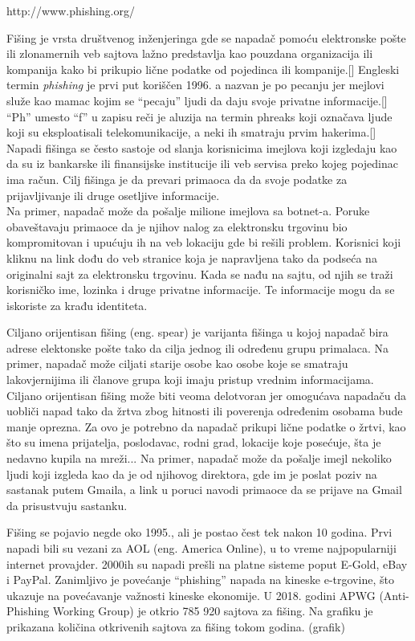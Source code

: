 \documentclass[a4paper]{article}
\begin{document}
http://www.phishing.org/

Fišing je vrsta društvenog inženjeringa gde se napadač pomoću elektronske pošte ili zlonamernih veb sajtova lažno predstavlja kao pouzdana organizacija ili kompanija kako bi prikupio lične podatke od pojedinca ili kompanije.[] Engleski termin {\em  phishing} je prvi put koriščen 1996. a nazvan je po pecanju jer mejlovi služe kao mamac kojim se “pecaju” ljudi da daju svoje privatne informacije.[] “Ph” umesto “f” u zapisu reči je aluzija na termin phreaks koji označava ljude koji su eksploatisali telekomunikacije, a neki ih smatraju prvim hakerima.[] 
Napadi fišinga se često sastoje od slanja korisnicima imejlova koji izgledaju kao da su iz bankarske ili finansijske institucije ili veb servisa preko kojeg pojedinac ima račun. Cilj fišinga je da prevari primaoca da da svoje podatke za prijavljivanje ili druge osetljive informacije. 
\\Na primer, napadač može da pošalje milione imejlova sa botnet-a. Poruke obaveštavaju primaoce da je njihov nalog za elektronsku trgovinu bio kompromitovan i upućuju ih na veb lokaciju gde bi rešili problem. Korisnici koji kliknu na link dođu do veb stranice koja je napravljena tako da podseća na originalni sajt za elektronsku trgovinu. Kada se nađu na sajtu, od njih se traži korisničko ime, lozinka i druge privatne informacije. Te informacije mogu da se iskoriste za krađu identiteta.

Ciljano orijentisan fišing (eng. spear) je varijanta fišinga u kojoj napadač bira adrese elektonske pošte tako da cilja jednog ili određenu grupu primalaca. Na primer, napadač može ciljati starije osobe kao osobe koje se smatraju lakovjernijima ili članove grupa koji imaju pristup vrednim informacijama. Ciljano orijentisan fišing može biti veoma delotvoran jer omogućava napadaču da uobliči napad tako da žrtva zbog hitnosti ili poverenja određenim osobama bude manje oprezna. Za ovo je potrebno da napadač prikupi lične podatke o žrtvi, kao što su imena prijatelja, poslodavac, rodni grad, lokacije koje posećuje, šta je nedavno kupila na mreži...
Na primer, napadač može da pošalje imejl nekoliko ljudi koji izgleda kao da je od njihovog direktora, gde im je poslat poziv na sastanak putem Gmaila, a link u poruci navodi primaoce da se prijave na Gmail da prisustvuju sastanku. 

Fišing se pojavio negde oko 1995., ali je postao čest tek nakon 10 godina. Prvi napadi bili su vezani za AOL (eng. America Online), u to vreme najpopularniji internet provajder. 2000ih su napadi prešli na platne sisteme poput E-Gold, eBay i PayPal.
Zanimljivo je povećanje “phishing” napada na kineske e-trgovine, što ukazuje na povećavanje važnosti kineske ekonomije. U 2018. godini APWG (Anti-Phishing Working Group) je otkrio 785 920 sajtova za fišing. Na grafiku je prikazana količina otkrivenih sajtova za fišing tokom godina. (grafik)
\end{document}
